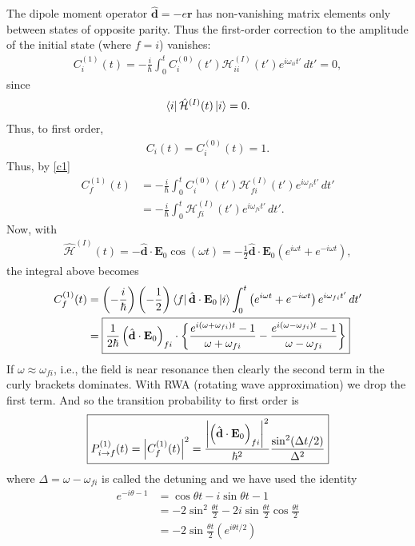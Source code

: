 \documentclass{book}
\theoremstyle{definition}
\newcommand{\ham}{\mathcal{H}}
\newcommand{\f}[2]{\frac{#1}{#2}}
\newcommand{\lp}{\left(}
\newcommand{\rp}{\right)}
\newcommand{\lc}{\left\{}
\newcommand{\rc}{\right\}}
\begin{document}
The dipole moment operator $\hat{\mathbf{d}} = -e\mathbf{r}$ has non-vanishing matrix elements only between states of opposite parity. Thus the first-order correction to the amplitude of the initial state (where $f=i$) vanishes:
\begin{align}
{C}_i^{(1)}(t) = -\f{i}{\hbar}\int_0^t C_i^{(0)}(t')\ham^{(I)}_{ii}(t')e^{i\omega_{ii}t'}\,dt' = 0,
\end{align}
since 
\begin{align}
\bra{i}\hat{\ham}^{(I)}(t)\ket{i} = 0.
\end{align}
Thus, to first order, 
\begin{align}
C_i(t) = C_i^{(0)}(t) = 1.
\end{align}
Thus, by \eqref{c1}
\begin{align}
{C}_f^{(1)}(t) &= -\f{i}{\hbar}\int_0^t C_i^{(0)}(t')\ham^{(I)}_{fi}(t')e^{i\omega_{fi}t'}\,dt' \\
&= -\f{i}{\hbar}\int_0^t \ham^{(I)}_{fi}(t')e^{i\omega_{fi}t'}\,dt'.
\end{align}
Now, with
\begin{align}
\hat{\ham}^{(I)}(t) = - \hat{\mathbf{d}}\cdot \mathbf{E}_0 \cos(\omega t) = - \f{1}{2}\hat{\mathbf{d}}\cdot \mathbf{E}_0 \lp e^{i\omega t} + e^{-i\omega t} \rp,
\end{align}
the integral above becomes
\begin{align}\label{amplitude}
{C}_f^{(1)}(t) &= \lp-\f{i}{\hbar}\rp \lp-\f{1}{2}\rp \bra{f}\hat{\mathbf{d}}\cdot \mathbf{E}_0\ket{i}\int_0^t\lp e^{i\omega t} + e^{-i\omega t} \rp e^{i\omega_{fi}t'}\,dt'\\
&= \boxed{\f{1}{2\hbar}\lp \hat{\mathbf{d}}\cdot\mathbf{E}_0 \rp_{fi}\cdot\lc \f{e^{i(\omega + \omega_{fi})t} - 1}{\omega + \omega_{fi}} 
- \f{e^{i(\omega - \omega_{fi})t} - 1}{\omega - \omega_{fi}}\rc}
\end{align}
If $\omega \approx \omega_{fi}$, i.e., the field is near resonance then clearly the second term in the curly brackets dominates. With RWA (rotating wave approximation) we drop the first term. And so the transition probability to first order is
\begin{align}
\boxed{P^{(1)}_{i\to f}(t) = \abs{C^{(1)}_f(t)}^2 = \f{\abs{\lp \hat{\mathbf{d}}\cdot\mathbf{E}_0 \rp_{fi}}^2}{\hbar^2} \f{\sin^2(\Delta t/2)}{\Delta^2}}
\end{align}
where $\Delta = \omega - \omega_{fi}$ is called the detuning and we have used the identity
\begin{align}
e^{-i\theta - 1} &= \cos\theta t - i\sin\theta t - 1\\
&=-2\sin^2 \f{\theta t}{2} - 2i\sin \f{\theta t}{2}\cos\f{\theta t}{2} \\
&= -2\sin \f{\theta t}{2} \lp e^{i\theta t/2} \rp
\end{align}
\end{document}
